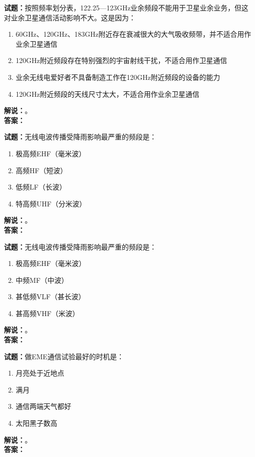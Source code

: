 \documentclass{ctexbook}
\begin{document}
\bigskip




\noindent\textbf{试题：}按照频率划分表，122.25—123\unit{\GHz}业余频段不能用于卫星业余业务，但这对业余卫星通信活动影响不大。这是因为：
\begin{enumerate}[leftmargin=3em]
\item 60\unit{\GHz}、120\unit{\GHz}、183\unit{\GHz}附近存在衰减很大的大气吸收频带，并不适合用作业余卫星通信
\item 120\unit{\GHz}附近频段存在特别强烈的宇宙射线干扰，不适合用作卫星通信
\item 业余无线电爱好者不具备制造工作在120\unit{\GHz}附近频段的设备的能力
\item 120\unit{\GHz}附近频段的天线尺寸太大，不适合用作业余卫星通信
\end{enumerate}
\noindent\textbf{解说：}\textbf{}。\\\noindent\textbf{答案：}

\bigskip




\noindent\textbf{试题：}无线电波传播受降雨影响最严重的频段是：
\begin{enumerate}[leftmargin=3em]
\item 极高频EHF（毫米波）
\item 高频HF（短波）
\item 低频LF（长波）
\item 特高频UHF（分米波）
\end{enumerate}
\noindent\textbf{解说：}\textbf{}。\\\noindent\textbf{答案：}

\bigskip




\noindent\textbf{试题：}无线电波传播受降雨影响最严重的频段是：
\begin{enumerate}[leftmargin=3em]
\item 极高频EHF（毫米波）
\item 中频MF（中波）
\item 甚低频VLF（甚长波）
\item 甚高频VHF（米波）
\end{enumerate}
\noindent\textbf{解说：}\textbf{}。\\\noindent\textbf{答案：}

\bigskip




\noindent\textbf{试题：}做EME通信试验最好的时机是：
\begin{enumerate}[leftmargin=3em]
\item 月亮处于近地点
\item 满月
\item 通信两端天气都好
\item 太阳黑子数高
\end{enumerate}
\noindent\textbf{解说：}\textbf{}。\\\noindent\textbf{答案：}
\end{document}
